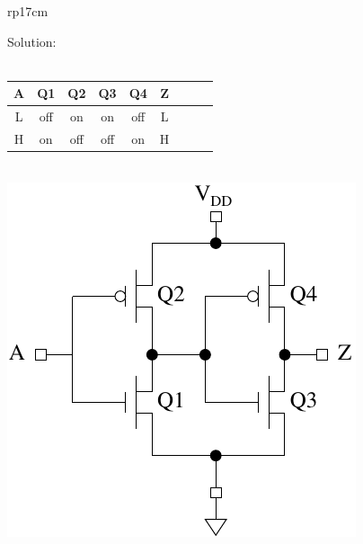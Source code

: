 \documentclass{article}
\begin{document}
\begin{longtable}[l]{rp{17cm}}
\begin{minipage}[t]{\linewidth}
Solution: \\ \\
\begin{tabular}{ccccccccc}
  \textbf{A} & \textbf{Q1} & \textbf{Q2} & \textbf{Q3} & \textbf{Q4} & \textbf{Z} \\
  \hline
  L & off & on & on & off & L\\
  H & on & off & off & on & H\\
\end{tabular} \\
\includegraphics{../CMOSCircuits/Assessments/CMOSBufferGate}
\end{minipage}\\
\medskip
\end{longtable}
\end{document}
